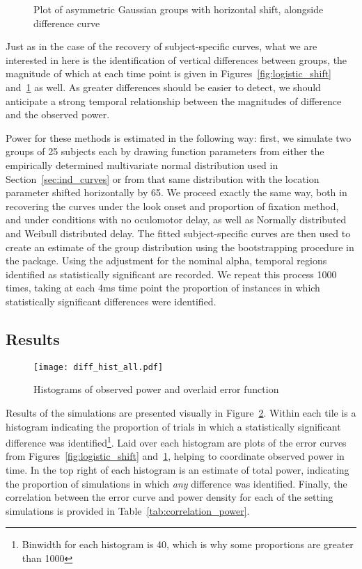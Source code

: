 \begin{figure}[H]
    \centering
    \caption{Plot of asymmetric Gaussian groups with horizontal shift, alongside difference curve}
\label{fig:dg_shift}
\end{figure}

Just as in the case of the recovery of subject-specific curves, what we are interested in here is the identification of vertical differences between groups, the magnitude of which at each time point is given in Figures~\ref{fig:logistic_shift} and~\ref{fig:dg_shift} as well. As greater differences should be easier to detect, we should anticipate a strong temporal relationship between the magnitudes of difference  and the observed power.

Power for these methods is estimated in the following way: first, we simulate two groups of 25 subjects each by drawing function parameters from either the empirically determined multivariate normal distribution used in Section~\ref{sec:ind_curves} or from that same distribution with the location parameter shifted horizontally by 65. We proceed exactly the same way, both in recovering the curves under the look onset and proportion of fixation method, and under conditions with no oculomotor delay, as well as Normally distributed and Weibull distributed delay. The fitted subject-specific curves are then used to create an estimate of the group distribution using the bootstrapping procedure in the  package. Using the  adjustment for the nominal alpha, temporal regions identified as statistically significant are recorded. We repeat this process 1000 times, taking at each 4ms time point the proportion of instances in which statistically significant differences were identified.



\subsection{Results}

\begin{figure}[H]
\centering
\texttt{[image: diff\_hist\_all.pdf]}
\caption{Histograms of observed power and overlaid error function}
\label{fig:diff_hist_all}
\end{figure}


Results of the simulations are presented visually in Figure~\ref{fig:diff_hist_all}. Within each tile is a histogram indicating the proportion of trials in which a statistically significant difference was identified\footnote{Binwidth for each histogram is 40, which is why some proportions are greater than 1000}. Laid over each histogram are plots of the error curves from Figures~\ref{fig:logistic_shift} and~\ref{fig:dg_shift}, helping to coordinate observed power in time. In the top right of each histogram is an estimate of total power, indicating the proportion of simulations in which \textit{any} difference was identified. Finally, the correlation between the error curve and power density for each of the setting simulations is provided in Table~\ref{tab:correlation_power}.


